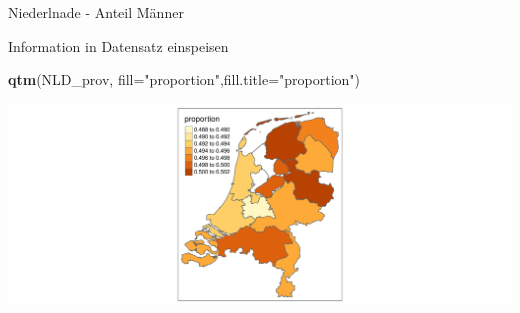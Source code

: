 \documentclass[ignorenonframetext,]{beamer}
\newenvironment{Shaded}{\begin{snugshade}}{\end{snugshade}}
\newcommand{\KeywordTok}[1]{\textcolor[rgb]{0.13,0.29,0.53}{\textbf{#1}}}
\newcommand{\DataTypeTok}[1]{\textcolor[rgb]{0.13,0.29,0.53}{#1}}
\newcommand{\StringTok}[1]{\textcolor[rgb]{0.31,0.60,0.02}{#1}}
\newcommand{\OperatorTok}[1]{\textcolor[rgb]{0.81,0.36,0.00}{\textbf{#1}}}
\newcommand{\NormalTok}[1]{#1}
\begin{document}
\begin{frame}[fragile]{Niederlnade - Anteil Männer}

Information in Datensatz einspeisen

\begin{Shaded}
\end{Shaded}

\begin{Shaded}
\begin{Highlighting}[]
\KeywordTok{qtm}\NormalTok{(NLD_prov, }\DataTypeTok{fill=}\StringTok{"proportion"}\NormalTok{,}\DataTypeTok{fill.title=}\StringTok{"proportion"}\NormalTok{) }
\end{Highlighting}
\end{Shaded}

\includegraphics{slides_all2gether_part1_files/figure-beamer/unnamed-chunk-75-1.pdf}

\end{frame}
\end{document}
